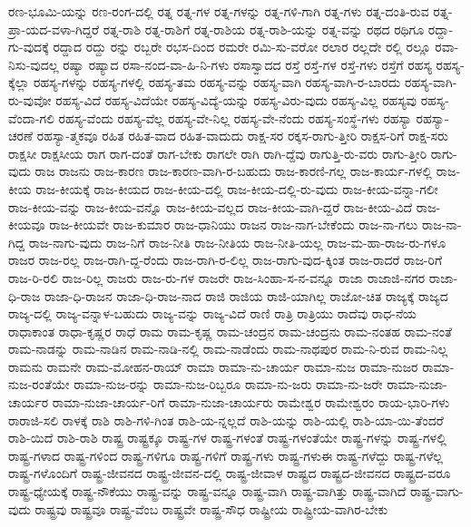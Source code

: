 {ರಣ-ಭೂಮಿ-ಯನ್ನು
ರಣ-ರಂಗ-ದಲ್ಲಿ
ರತ್ನ
ರತ್ನ-ಗಳ
ರತ್ನ-ಗಳನ್ನು
ರತ್ನ-ಗಳಿ-ಗಾಗಿ
ರತ್ನ-ಗಳು
ರತ್ನ-ದಂತಿ-ರುವ
ರತ್ನ-ಪ್ರಾ-ಯದ-ವಳಾ-ಗಿದ್ದರೆ
ರತ್ನ-ರಾಶಿ
ರತ್ನ-ರಾಶಿಗೆ
ರತ್ನ-ರಾಶಿಯ
ರತ್ನ-ರಾಶಿ-ಯನ್ನು
ರತ್ನ-ವನ್ನು
ರಥದ
ರಥಿಗೂ
ರದ್ದಾ-ಗು-ವುದಕ್ಕೆ
ರದ್ದಾದ
ರದ್ದು
ರನ್ನು
ರಬ್ಬರೇ
ರಭಸ-ದಿಂದ
ರಮರೇ
ರಮಿ-ಸು-ವರೋ
ರಲಾರ
ರಲ್ಲದೇ
ರಲ್ಲಿ
ರಲ್ಲೂ
ರವಾ-ನಿಸು-ವುದಲ್ಲ
ರಷ್ಯಾ
ರಷ್ಯಾದ
ರಸಾ-ನಂದ-ವಾ-ಹಿ-ನಿ-ಗಳು
ರಸಾಸ್ವಾದದ
ರಸ್ತೆ
ರಸ್ತೆ-ಗಳ
ರಸ್ತೆ-ಗಳು
ರಸ್ತೆಗೆ
ರಹಸ್ಯ
ರಹಸ್ಯ-ಕ್ಕೆಲ್ಲಾ
ರಹಸ್ಯ-ಗಳನ್ನು
ರಹಸ್ಯ-ಗಳಲ್ಲಿ
ರಹಸ್ಯ-ತಮ
ರಹಸ್ಯ-ವನ್ನು
ರಹಸ್ಯ-ವಾಗಿ
ರಹಸ್ಯ-ವಾಗಿ-ರ-ಬಾರದು
ರಹಸ್ಯ-ವಾಗಿ-ರು-ವುವೋ
ರಹಸ್ಯ-ವಿದೆ
ರಹಸ್ಯ-ವಿದೆಯೇ
ರಹಸ್ಯ-ವಿದ್ಯೆ-ಯನ್ನು
ರಹಸ್ಯ-ವಿರು-ವುದು
ರಹಸ್ಯ-ವಿಲ್ಲ
ರಹಸ್ಯವು
ರಹಸ್ಯ-ವೆಂದಾ-ಗಲಿ
ರಹಸ್ಯ-ವೆಂದು
ರಹಸ್ಯ-ವೆಲ್ಲ
ರಹಸ್ಯ-ವೇ-ನಿಲ್ಲ
ರಹಸ್ಯ-ವೇ-ನೆಂದು
ರಹಸ್ಯ-ಸಂಸ್ಥೆ-ಗಳು
ರಹಸ್ಯಾ
ರಹಸ್ಯಾ-ಚರಣೆ
ರಹಸ್ಯಾ-ತ್ಮಕವೂ
ರಹಿತ
ರಹಿತ-ವಾದ
ರಹಿತ-ವಾದುದು
ರಾಕ್ಷ-ಸರ
ರಕ್ಕಸ-ರಾಗು-ತ್ತೀರಿ
ರಾಕ್ಷಸ-ರಿಗೆ
ರಾಕ್ಷ-ಸರು
ರಾಕ್ಷಸೀ
ರಾಕ್ಷಸೀಯ
ರಾಗ
ರಾಗ-ದಂತೆ
ರಾಗ-ಬೇಕು
ರಾಗಲೇ
ರಾಗಿ
ರಾಗಿ-ದ್ದೆವು
ರಾಗುತ್ತಿ-ರು-ವರು
ರಾಗು-ತ್ತೀರಿ
ರಾಗು-ವುದು
ರಾಜ
ರಾಜನು
ರಾಜ-ಕಾರಣ
ರಾಜ-ಕಾರಣ-ವಾಗಿ-ರ-ಬಹುದು
ರಾಜ-ಕಾರಣಿ-ಗಲ್ಲ
ರಾಜ-ಕಾರ್ಯ-ಗಳಲ್ಲಿ
ರಾಜ-ಕೀಯ
ರಾಜ-ಕೀಯಕ್ಕೆ
ರಾಜ-ಕೀಯದ
ರಾಜ-ಕೀಯ-ದಲ್ಲಿ
ರಾಜ-ಕೀಯ-ದಲ್ಲಿ-ರು-ವುದು
ರಾಜ-ಕೀಯ-ವನ್ನಾ-ಗಲೀ
ರಾಜ-ಕೀಯ-ವನ್ನು
ರಾಜ-ಕೀಯ-ವನ್ನೊ
ರಾಜ-ಕೀಯ-ವಲ್ಲದ
ರಾಜ-ಕೀಯ-ವಾಗಿ-ದ್ದರೆ
ರಾಜ-ಕೀಯ-ವಿದೆ
ರಾಜ-ಕೀಯವೂ
ರಾಜ-ಕೀಯವೇ
ರಾಜ-ಕುಮಾರ
ರಾಜ-ಧಾನಿಯು
ರಾಜನ
ರಾಜ-ನಾಗ-ಬೇಕೆಂದು
ರಾಜ-ನಾ-ಗಲು
ರಾಜ-ನಾ-ಗಿದ್ದ
ರಾಜ-ನಾಗು-ವುದು
ರಾಜ-ನಿಗೆ
ರಾಜ-ನೀತಿ
ರಾಜ-ನೀತಿಯ
ರಾಜ-ನೀತಿ-ಯಲ್ಲ
ರಾಜ-ಮ-ಹಾ-ರಾಜ-ರು-ಗಳೂ
ರಾಜರ
ರಾಜ-ರಲ್ಲ
ರಾಜ-ರಾಗಿ-ದ್ದ-ರೆಂದು
ರಾಜ-ರಾಗಿ-ರ-ಲಿಲ್ಲ
ರಾಜ-ರಾಗು-ವುದ-ಕ್ಕಿಂತ
ರಾಜ-ರಾದರೆ
ರಾಜ-ರಿಗೆ
ರಾಜ-ರಿ-ರಲಿ
ರಾಜ-ರಿಲ್ಲ
ರಾಜರು
ರಾಜ-ರು-ಗಳ
ರಾಜರೇ
ರಾಜ-ಸಿಂಹಾ-ಸ-ನ-ವನ್ನೂ
ರಾಜಾ
ರಾಜಾಜಿ-ನಗರ
ರಾಜಾ-ಧಿ-ರಾಜ
ರಾಜಾ-ಧಿ-ರಾಜನ
ರಾಜಾ-ಧಿ-ರಾಜ-ನಾದ
ರಾಜಿ
ರಾಜಿಯ
ರಾಜಿ-ಯಾಗಿಲ್ಲ
ರಾಜೋ-ಚಿತ
ರಾಜ್ಯಕ್ಕೆ
ರಾಜ್ಯದ
ರಾಜ್ಯ-ದಲ್ಲಿ
ರಾಜ್ಯ-ವನ್ನಾಳ-ಬಹುದು
ರಾಜ್ಯ-ವನ್ನು
ರಾಜ್ಯ-ವಿದೆ
ರಾಣಿ
ರಾತ್ರಿ
ರಾತ್ರಿಯು
ರಾದೆವು
ರಾಧ-ನೆಯ
ರಾಧಾಕಾಂತ
ರಾಧಾ-ಕೃಷ್ಣರ
ರಾಧೆ
ರಾಮ
ರಾಮ-ಕೃಷ್ಣ
ರಾಮ-ಚಂದ್ರನ
ರಾಮ-ಚಂದ್ರನು
ರಾಮ-ನಂತಹ
ರಾಮ-ನಂತೆ
ರಾಮ-ನಾಡನ್ನು
ರಾಮ-ನಾಡಿನ
ರಾಮ-ನಾಡಿ-ನಲ್ಲಿ
ರಾಮ-ನಾಡೆಂದು
ರಾಮ-ನಾಥಪುರ
ರಾಮ-ನಿ-ರುವ
ರಾಮ-ನಿಲ್ಲ
ರಾಮನು
ರಾಮನೇ
ರಾಮ-ಮೋಹನ-ರಾಯ್
ರಾಮಾ
ರಾಮಾ-ನು-ಚಾರ್ಯ
ರಾಮಾ-ನುಜ
ರಾಮಾ-ನುಜರ
ರಾಮಾ-ನುಜ-ರಂತೆಯೇ
ರಾಮಾ-ನುಜ-ರನ್ನು
ರಾಮಾ-ನುಜ-ರಿಬ್ಬರೂ
ರಾಮಾ-ನು-ಜರು
ರಾಮಾ-ನು-ಜರೇ
ರಾಮಾ-ನುಜಾ-ಚಾರ್ಯರ
ರಾಮಾ-ನುಜಾ-ಚಾರ್ಯ-ರಿಗೆ
ರಾಮಾ-ನುಜಾ-ಚಾರ್ಯರು
ರಾಮೇಶ್ವರ
ರಾಮೇಶ್ವರಂ
ರಾಯ-ಭಾರಿ-ಗಳು
ರಾರಾಜಿ-ಸಲಿ
ರಾಳಕ್ಕೆ
ರಾಶಿ
ರಾಶಿ-ಗಳಿ-ಗಿಂತ
ರಾಶಿ-ಯ-ನ್ನಲ್ಲದೆ
ರಾಶಿ-ಯನ್ನು
ರಾಶಿ-ಯಲ್ಲಿ
ರಾಶಿ-ಯಾ-ಯಿ-ತೆಂದರೆ
ರಾಶಿ-ಯಿದೆ
ರಾಶಿ-ರಾಶಿ
ರಾಷ್ಟ್ರ
ರಾಷ್ಟ್ರಕ್ಕೂ
ರಾಷ್ಟ್ರ-ಗಳ
ರಾಷ್ಟ್ರ-ಗಳಂತೆ
ರಾಷ್ಟ್ರ-ಗಳಂತೆಯೇ
ರಾಷ್ಟ್ರ-ಗಳನ್ನು
ರಾಷ್ಟ್ರ-ಗಳಲ್ಲಿ
ರಾಷ್ಟ್ರ-ಗಳಾದ
ರಾಷ್ಟ್ರ-ಗಳಿಂದ
ರಾಷ್ಟ್ರ-ಗಳಿಗೂ
ರಾಷ್ಟ್ರ-ಗಳಿಗೆ
ರಾಷ್ಟ್ರ-ಗಳು
ರಾಷ್ಟ್ರ-ಗಳುಈ
ರಾಷ್ಟ್ರ-ಗಳೆದ್ದು
ರಾಷ್ಟ್ರ-ಗಳೆಲ್ಲ
ರಾಷ್ಟ್ರ-ಗಳೊಂದಿಗೆ
ರಾಷ್ಟ್ರ-ಜೀವನದ
ರಾಷ್ಟ್ರ-ಜೀವನ-ದಲ್ಲಿ
ರಾಷ್ಟ್ರ-ಜೀವಾಳ
ರಾಷ್ಟ್ರದ
ರಾಷ್ಟ್ರದ-ಜೀವನದ
ರಾಷ್ಟ್ರದ-ವರೂ
ರಾಷ್ಟ್ರ-ಧ್ಯೇಯಕ್ಕೆ
ರಾಷ್ಟ್ರ-ನೌಕೆಯು
ರಾಷ್ಟ್ರ-ವನ್ನು
ರಾಷ್ಟ್ರ-ವನ್ನೂ
ರಾಷ್ಟ್ರ-ವಾಗಿ
ರಾಷ್ಟ್ರ-ವಾಗಿತ್ತು
ರಾಷ್ಟ್ರ-ವಾಗಿದೆ
ರಾಷ್ಟ್ರ-ವಾಗು-ವುದು
ರಾಷ್ಟ್ರವು
ರಾಷ್ಟ್ರವೂ
ರಾಷ್ಟ್ರ-ವೆಂಬ
ರಾಷ್ಟ್ರವೇ
ರಾಷ್ಟ್ರ-ಸೌಧ
ರಾಷ್ಟ್ರೀಯ
ರಾಷ್ಟ್ರೀಯ-ವಾಗಿರ-ಬೇಕು
}

